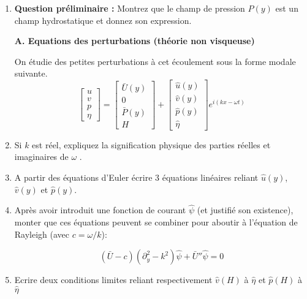 \documentclass[a4paper,11pt]{article}
\begin{document}
 \begin{enumerate}
 
 \item { \bf Question préliminaire :} Montrez que le champ de pression $P(y)$ est un champ hydrostatique et donnez son expression.

{\bf A. Equations des perturbations (théorie non visqueuse)}

On étudie des petites perturbations à cet écoulement sous la forme modale suivante.
$$
\left[ \begin{array}{c} u \\ v \\ p \\ \eta \end{array} \right] 
= 
\left[ \begin{array}{c} \bar{U}(y) \\ 0 \\ \bar{P}(y) \\ H \end{array} \right] 
+ 
\left[ \begin{array}{c} \hat{u}(y) \\ \hat{v}(y) \\ \hat{p}(y) \\ \hat{\eta} \end{array} \right] e^{i (k x -\omega t)} 
$$

\item Si $k$ est réel, expliquez la signification physique des parties réelles et imaginaires de $\omega$ .

\item 
A partir des équations d'Euler écrire 3 équations linéaires reliant $ \hat{u}(y)$, $\hat{v}(y)$ et $\hat{p}(y)$.

  \item Après avoir introduit une fonction de courant $\hat{\psi}$ (et justifié son existence), monter que ces équations peuvent se combiner pour aboutir à l'équation de Rayleigh (avec $c = \omega/k$):
  
 \begin{equation}
 (\bar{U} - c) (\partial_y^2 - k^2) \hat \psi + \bar{U}'' \hat \psi = 0
 \end{equation}
  
  \item 
  Ecrire deux conditions limites reliant respectivement $\hat{v}(H)$ à $\hat{\eta}$ et $\hat{p}(H)$ à $\hat{\eta}$
   

\end{enumerate}
\end{document}
